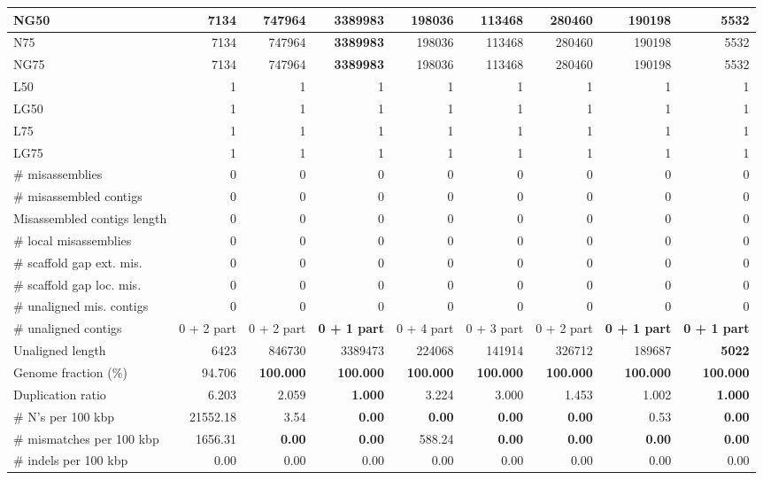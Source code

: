\documentclass[12pt,a4paper]{article}
\begin{document}
\begin{table}[ht]
\begin{center}
\begin{tabular}{|l*{8}{|r}|}
NG50 & 7134 & 747964 & {\bf 3389983} & 198036 & 113468 & 280460 & 190198 & 5532 \\ \hline
N75 & 7134 & 747964 & {\bf 3389983} & 198036 & 113468 & 280460 & 190198 & 5532 \\ \hline
NG75 & 7134 & 747964 & {\bf 3389983} & 198036 & 113468 & 280460 & 190198 & 5532 \\ \hline
L50 & 1 & 1 & 1 & 1 & 1 & 1 & 1 & 1 \\ \hline
LG50 & 1 & 1 & 1 & 1 & 1 & 1 & 1 & 1 \\ \hline
L75 & 1 & 1 & 1 & 1 & 1 & 1 & 1 & 1 \\ \hline
LG75 & 1 & 1 & 1 & 1 & 1 & 1 & 1 & 1 \\ \hline
\# misassemblies & 0 & 0 & 0 & 0 & 0 & 0 & 0 & 0 \\ \hline
\# misassembled contigs & 0 & 0 & 0 & 0 & 0 & 0 & 0 & 0 \\ \hline
Misassembled contigs length & 0 & 0 & 0 & 0 & 0 & 0 & 0 & 0 \\ \hline
\# local misassemblies & 0 & 0 & 0 & 0 & 0 & 0 & 0 & 0 \\ \hline
\# scaffold gap ext. mis. & 0 & 0 & 0 & 0 & 0 & 0 & 0 & 0 \\ \hline
\# scaffold gap loc. mis. & 0 & 0 & 0 & 0 & 0 & 0 & 0 & 0 \\ \hline
\# unaligned mis. contigs & 0 & 0 & 0 & 0 & 0 & 0 & 0 & 0 \\ \hline
\# unaligned contigs & 0 + 2 part & 0 + 2 part & {\bf 0 + 1 part} & 0 + 4 part & 0 + 3 part & 0 + 2 part & {\bf 0 + 1 part} & {\bf 0 + 1 part} \\ \hline
Unaligned length & 6423 & 846730 & 3389473 & 224068 & 141914 & 326712 & 189687 & {\bf 5022} \\ \hline
Genome fraction (\%) & 94.706 & {\bf 100.000} & {\bf 100.000} & {\bf 100.000} & {\bf 100.000} & {\bf 100.000} & {\bf 100.000} & {\bf 100.000} \\ \hline
Duplication ratio & 6.203 & 2.059 & {\bf 1.000} & 3.224 & 3.000 & 1.453 & 1.002 & {\bf 1.000} \\ \hline
\# N's per 100 kbp & 21552.18 & 3.54 & {\bf 0.00} & {\bf 0.00} & {\bf 0.00} & {\bf 0.00} & 0.53 & {\bf 0.00} \\ \hline
\# mismatches per 100 kbp & 1656.31 & {\bf 0.00} & {\bf 0.00} & 588.24 & {\bf 0.00} & {\bf 0.00} & {\bf 0.00} & {\bf 0.00} \\ \hline
\# indels per 100 kbp & 0.00 & 0.00 & 0.00 & 0.00 & 0.00 & 0.00 & 0.00 & 0.00 \\ \hline

\end{tabular}
\end{center}
\end{table}
\end{document}
